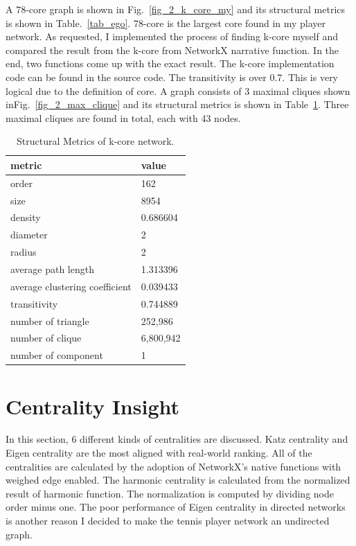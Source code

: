 \documentclass[runningheads]{llncs}
\begin{document}
A 78-core graph is shown in Fig.~\ref{fig_2_k_core_my} and its structural metrics is shown in Table.~\ref{tab_ego}. 78-core is the largest core found in my player network. As requested, I implemented the process of finding k-core myself and compared the result from the k-core from NetworkX narrative function. In the end, two functions come up with the exact result. The k-core implementation code can be found in the source code.
The transitivity is over 0.7. This is very logical due to the definition of core.
A graph consists of 3 maximal cliques shown inFig.~\ref{fig_2_max_clique} and its structural metrics is shown in Table~\ref{tab_kcore}. Three maximal cliques are found in total, each with 43 nodes.

\begin{table}[H]
\centering
\caption{Structural Metrics of k-core network.}\label{tab_kcore}
\begin{tabular}{|l|l|}
\hline
metric & value \\
\hline
order & 162 \\
size & 8954 \\
density & 0.686604 \\
diameter & 2 \\
radius & 2 \\
average path length & 1.313396 \\
average clustering coefficient & 0.039433 \\
transitivity & 0.744889 \\
number of triangle & 252,986 \\
number of clique & 6,800,942 \\
number of component & 1 \\
\hline
\end{tabular}
\end{table}



 
\section{Centrality Insight}

In this section, 6 different kinds of centralities are discussed. Katz centrality and Eigen centrality are the most aligned with real-world ranking. All of the centralities are calculated by the adoption of NetworkX's native functions with weighed edge enabled. The harmonic centrality is calculated from the normalized result of harmonic function. The normalization is computed by dividing node order minus one. The poor performance of Eigen centrality in directed networks is another reason I decided to make the tennis player network an undirected graph.
\end{document}
